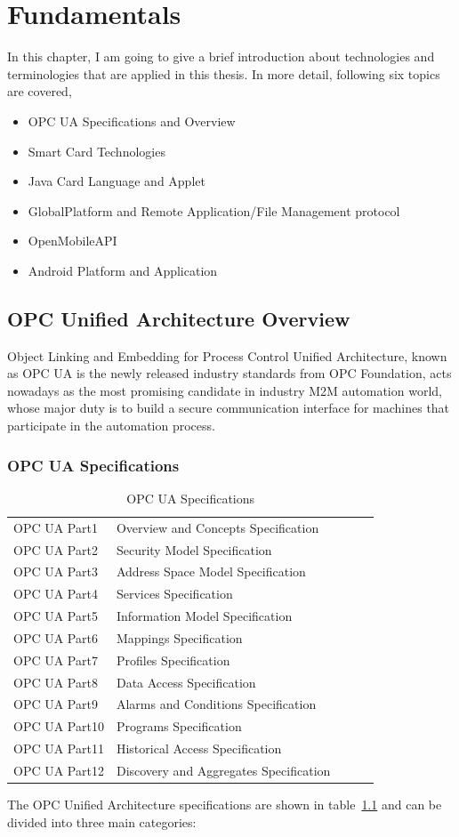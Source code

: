 \chapter{Fundamentals}

In this chapter, I am going to give a brief introduction about technologies and terminologies that are applied in this thesis. In more detail, following six topics are covered,
\begin{itemize}
\item OPC UA Specifications and Overview
\item Smart Card Technologies
\item Java Card Language and Applet
\item GlobalPlatform and Remote Application/File Management protocol
\item OpenMobileAPI
\item Android Platform and Application
\end{itemize}
\section{OPC Unified Architecture Overview }
Object Linking and Embedding for Process Control Unified Architecture, known as OPC UA is the newly released industry standards from OPC Foundation, acts nowadays as the most promising candidate in industry M2M automation world, whose major duty is to build a secure communication interface for machines that participate in the automation process. 

\subsection{OPC UA Specifications} \label{secOPC}

\begin{table}[!htb]
\caption{OPC UA Specifications}
\centering
\begin{tabular}{lllll}
\hline\hline
OPC UA Part1 &Overview and Concepts Specification \\
OPC UA Part2 &Security Model Specification \\
OPC UA Part3 &Address Space Model Specification\\
OPC UA Part4 &Services Specification\\
OPC UA Part5 &Information Model Specification  \\
OPC UA Part6 &Mappings Specification \\
OPC UA Part7 &Profiles Specification \\
OPC UA Part8 &Data Access Specification  \\
OPC UA Part9 &Alarms and Conditions Specification \\
OPC UA Part10 &Programs Specification  \\
OPC UA Part11 &Historical Access Specification \\
OPC UA Part12 &Discovery and Aggregates Specification \\
\hline
\end{tabular}
\label{table:opcua}
\end{table}
The OPC Unified Architecture specifications are shown in table~\ref{table:opcua} and can be divided into three main categories:

